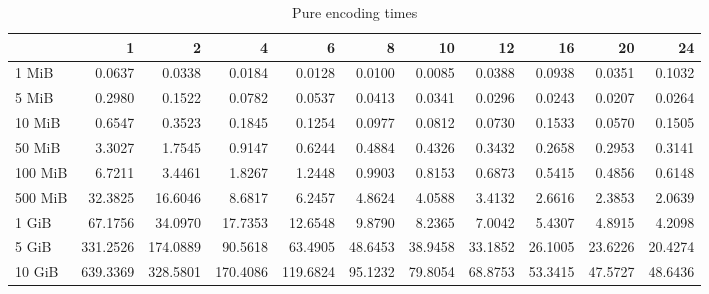 \begin{table}[!h]
	\caption{Pure encoding times}
\begin{tabular}{lrrrrrrrrrr}
	\toprule
	\diagbox{File sizes }{Threads}  &        1  &        2  &        4  &        6  &       8  &       10 &       12 &       16 &       20 &       24 \\
	\midrule
	1 MiB   &    0.0637 &    0.0338 &    0.0184 &    0.0128 &   0.0100 &   0.0085 &   0.0388 &   0.0938 &   0.0351 &   0.1032 \\
	5 MiB   &    0.2980 &    0.1522 &    0.0782 &    0.0537 &   0.0413 &   0.0341 &   0.0296 &   0.0243 &   0.0207 &   0.0264 \\
	10 MiB  &    0.6547 &    0.3523 &    0.1845 &    0.1254 &   0.0977 &   0.0812 &   0.0730 &   0.1533 &   0.0570 &   0.1505 \\
	50 MiB  &    3.3027 &    1.7545 &    0.9147 &    0.6244 &   0.4884 &   0.4326 &   0.3432 &   0.2658 &   0.2953 &   0.3141 \\
	100 MiB &    6.7211 &    3.4461 &    1.8267 &    1.2448 &   0.9903 &   0.8153 &   0.6873 &   0.5415 &   0.4856 &   0.6148 \\
	500 MiB &   32.3825 &   16.6046 &    8.6817 &    6.2457 &   4.8624 &   4.0588 &   3.4132 &   2.6616 &   2.3853 &   2.0639 \\
	1 GiB   &   67.1756 &   34.0970 &   17.7353 &   12.6548 &   9.8790 &   8.2365 &   7.0042 &   5.4307 &   4.8915 &   4.2098 \\
	5 GiB   &  331.2526 &  174.0889 &   90.5618 &   63.4905 &  48.6453 &  38.9458 &  33.1852 &  26.1005 &  23.6226 &  20.4274 \\
	10 GiB  &  639.3369 &  328.5801 &  170.4086 &  119.6824 &  95.1232 &  79.8054 &  68.8753 &  53.3415 &  47.5727 &  48.6436 \\
	\bottomrule
\end{tabular}
\end{table}
